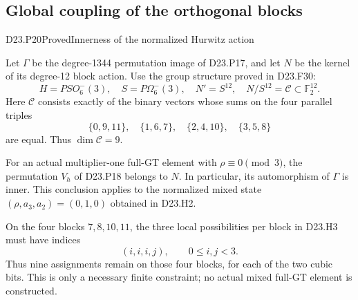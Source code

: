 \subsection{Global coupling of the orthogonal blocks}

\begin{statement}{D23.P20}{Proved}{Innerness of the normalized Hurwitz action}
\end{statement}
Let $\Gamma$ be the degree-1344 permutation image of
D23.P17, and let $N$ be the kernel of its degree-12 block
action. Use the group structure proved in D23.F30:
\[
 H=PSO^-_6(3),\quad S=P\Omega^-_6(3),\quad
 N'=S^{12},\quad N/S^{12}=\mathcal C\subset\mathbb F_2^{12}.
\]
Here $\mathcal C$ consists exactly of the binary vectors whose
sums on the four parallel triples
\[
 \{0,9,11\},\quad\{1,6,7\},\quad
 \{2,4,10\},\quad\{3,5,8\}                             \tag{D23.P20.1}
\]
are equal. Thus $\dim\mathcal C=9$.

For an actual multiplier-one full-GT element with
$\rho\equiv0\pmod3$, the permutation $V_h$ of D23.P18
belongs to $N$. In particular, its automorphism of
$\Gamma$ is inner. This conclusion applies to the normalized
mixed state $(\rho,a_3,a_2)=(0,1,0)$ obtained in D23.H2.

On the four blocks $7,8,10,11$, the three local possibilities
per block in D23.H3 must have indices
\[
                  (i,i,i,j),\qquad 0\leq i,j<3.            \tag{D23.P20.2}
\]
Thus nine assignments remain on those four blocks, for each
of the two cubic bits. This is only a necessary finite
constraint; no actual mixed full-GT element is constructed.


